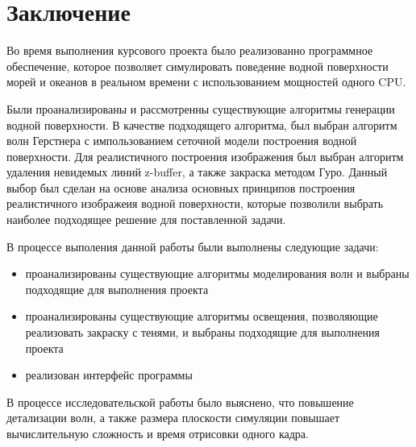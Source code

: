 \chapter*{Заключение}

Во время выполнения курсового проекта было реализованно программное обеспечение, которое позволяет симулировать поведение водной поверхности морей и океанов в реальном времени с использованием мощностей одного CPU.

Были проанализированы и рассмотренны существующие алгоритмы генерации водной поверхности. В качестве подходящего алгоритма, был выбран алгоритм волн Герстнера с импользованием сеточной модели построения водной поверхности. Для реалистичного построения изображения был выбран алгоритм удаления невидемых линий z-buffer, а также закраска методом Гуро. Данный выбор был сделан на основе анализа основных принципов построения реалистичного изображеия водной поверхности, которые позволили выбрать наиболее подходящее решение для поставленной задачи.

В процессе выполения данной работы были выполнены следующие задачи:

\begin{itemize}
	\item проанализированы существующие алгоритмы моделирования волн и выбраны подходящие для выполнения проекта
	\item проанализированы существующие алгоритмы освещения, позволяющие реализовать закраску с тенями, и выбраны подходящие для выполнения проекта
	\item реализован интерфейс программы
\end{itemize}

В процессе исследовательской работы было выяснено, что повышение детализации волн, а также размера плоскости симуляции повышает вычислительную сложность и время отрисовки одного кадра.

